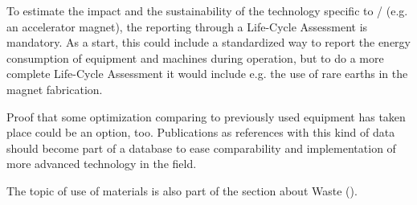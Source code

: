 \documentclass[../SustainableHEP.tex]{subfiles}
\begin{document}
\begin{table}
\captionsetup{type=table}
\caption[Emissions of silicon wafer production]{Emissions of silicon wafer production.~\cite{ProBasSi}}
\label{tab:InputOutput2}
\end{table}

To estimate the impact and the sustainability of the technology specific to \ACR/  (e.g. an accelerator magnet), the reporting through a Life-Cycle Assessment is mandatory. As a start, this could include a standardized way to report the energy consumption of equipment and machines during operation, but to do a more complete Life-Cycle Assessment it would include e.g. the use of rare earths in the magnet fabrication.

Proof that some optimization comparing to previously used equipment has taken place could be an option, too. Publications as references with this kind of data should become part of a database to ease comparability and implementation of more advanced technology in the field.

The topic of use of materials is also part of the section about Waste ().
\end{document}
